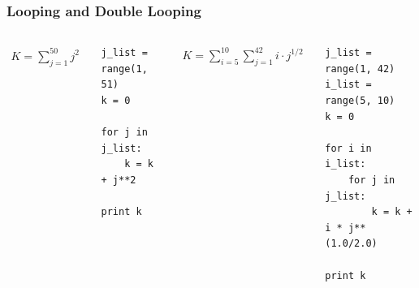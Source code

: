 \begin{frame}[fragile]

    \frametitle{Looping and Double Looping}

    \begin{columns}[t]


            \begin{align*}
                K = \sum_{j=1}^{50} j^2
            \end{align*}

\begin{lstlisting}
j_list = range(1, 51)
k = 0

for j in j_list:
    k = k + j**2 

print k
\end{lstlisting}



            \begin{align*}
                K = \sum_{i=5}^{10} \sum_{j=1}^{42} i \cdot j^{1/2}
            \end{align*}
\scriptsize
\begin{lstlisting}
j_list = range(1, 42)
i_list = range(5, 10)
k = 0

for i in i_list:
    for j in j_list:
        k = k + i * j**(1.0/2.0)

print k
\end{lstlisting}


    \end{columns}



\end{frame}


